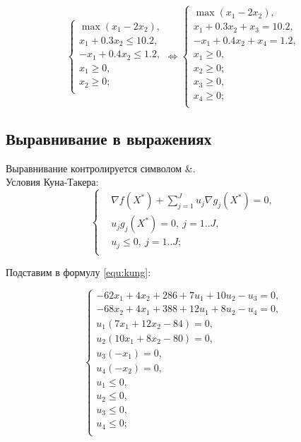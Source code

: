 \begin{equation}
	\left\{\begin{aligned}
		\max\left(x_1-2x_2\right), \\
		x_1+0.3x_2\leq 10.2, \\
		-x_1+0.4x_2\leq 1.2, \\
		x_1\geq 0, \\
		x_2\geq 0; \\
	\end{aligned}\right. \Longleftrightarrow
	\left\{\begin{aligned}
		\max\left(x_1-2x_2\right), \\
		x_1+0.3x_2+x_3=10.2, \\
		-x_1+0.4x_2+x_4=1.2, \\
		x_1\geq 0, \\
		x_2\geq 0; \\
		x_3\geq 0, \\
		x_4\geq 0; \\
	\end{aligned}\right.
\end{equation}

\subsection{Выравнивание в выражениях}

Выравнивание контролируется символом \&. \\

Условия Куна-Такера:
\begin{equation}
	\left\{\begin{aligned}
		&\nabla f(X^*)+\sum_{j=1}^{J} u_j \nabla g_j(X^*)=0,\\
		&u_j g_j(X^*)=0,~ j=1..J,\\
		&u_j \leq 0,~ j=1..J;\\
	\end{aligned}\right.
	\label{equ:kung}
\end{equation}

Подставим в формулу \cref{equ:kung}:

\begin{equation}
	\left\{\begin{aligned}
		-62x_1+4x_2+286+7u_1+10u_2-u_3=0,\\
		-68x_2+4x_1+388+12u_1+8u_2-u_4=0,\\
		u_1(7x_1+12x_2-84)=0,\\
		u_2(10x_1+8x_2-80)=0,\\
		u_3(-x_1)=0,\\
		u_4(-x_2)=0,\\
		u_1\leq 0,\\
		u_2\leq 0,\\
		u_3\leq 0,\\
		u_4\leq 0;\\
	\end{aligned}\right.
\end{equation}

